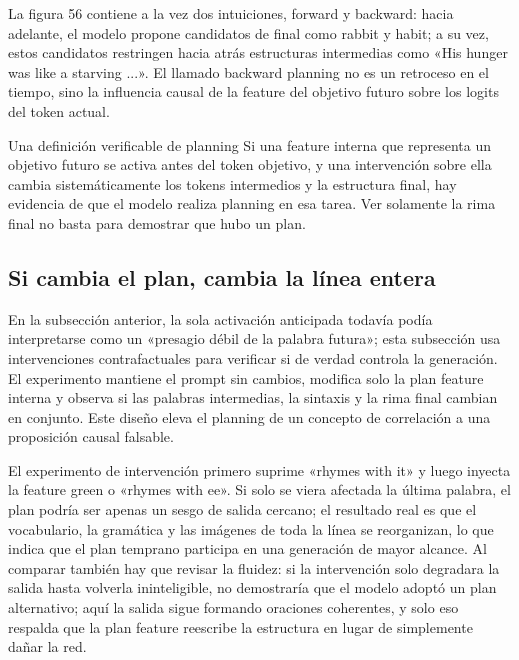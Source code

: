 La figura 56 contiene a la vez dos intuiciones, forward y backward: hacia adelante, el modelo propone candidatos de final como rabbit y habit; a su vez, estos candidatos restringen hacia atrás estructuras intermedias como «His hunger was like a starving ...». El llamado backward planning no es un retroceso en el tiempo, sino la influencia causal de la feature del objetivo futuro sobre los logits del token actual.

\begin{importantbox}{Una definición verificable de planning}
Si una feature interna que representa un objetivo futuro se activa antes del token objetivo, y una intervención sobre ella cambia sistemáticamente los tokens intermedios y la estructura final, hay evidencia de que el modelo realiza planning en esa tarea. Ver solamente la rima final no basta para demostrar que hubo un plan.
\end{importantbox}

\subsection{Si cambia el plan, cambia la línea entera}

En la subsección anterior, la sola activación anticipada todavía podía interpretarse como un «presagio débil de la palabra futura»; esta subsección usa intervenciones contrafactuales para verificar si de verdad controla la generación. El experimento mantiene el prompt sin cambios, modifica solo la plan feature interna y observa si las palabras intermedias, la sintaxis y la rima final cambian en conjunto. Este diseño eleva el planning de un concepto de correlación a una proposición causal falsable.

El experimento de intervención primero suprime «rhymes with it» y luego inyecta la feature green o «rhymes with ee». Si solo se viera afectada la última palabra, el plan podría ser apenas un sesgo de salida cercano; el resultado real es que el vocabulario, la gramática y las imágenes de toda la línea se reorganizan, lo que indica que el plan temprano participa en una generación de mayor alcance. Al comparar también hay que revisar la fluidez: si la intervención solo degradara la salida hasta volverla ininteligible, no demostraría que el modelo adoptó un plan alternativo; aquí la salida sigue formando oraciones coherentes, y solo eso respalda que la plan feature reescribe la estructura en lugar de simplemente dañar la red.


